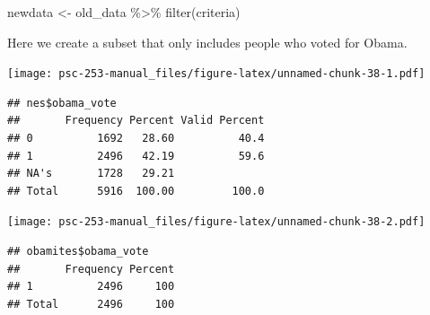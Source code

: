 \documentclass[
]{book}
\newenvironment{Shaded}{\begin{snugshade}}{\end{snugshade}}
\newcommand{\CommentTok}[1]{\textcolor[rgb]{0.56,0.35,0.01}{\textit{#1}}}
\newcommand{\DecValTok}[1]{\textcolor[rgb]{0.00,0.00,0.81}{#1}}
\newcommand{\FunctionTok}[1]{\textcolor[rgb]{0.00,0.00,0.00}{#1}}
\newcommand{\NormalTok}[1]{#1}
\newcommand{\OtherTok}[1]{\textcolor[rgb]{0.56,0.35,0.01}{#1}}
\newcommand{\SpecialCharTok}[1]{\textcolor[rgb]{0.00,0.00,0.00}{#1}}
\begin{document}
\begin{Shaded}
\begin{Highlighting}[]
\NormalTok{newdata }\OtherTok{\textless{}{-}}\NormalTok{ old\_data }\SpecialCharTok{\%\textgreater{}\%}
  \FunctionTok{filter}\NormalTok{(criteria)}
\end{Highlighting}
\end{Shaded}

Here we create a subset that only includes people who voted for Obama.

\begin{Shaded}
\end{Shaded}

\texttt{[image: psc-253-manual\_files/figure-latex/unnamed-chunk-38-1.pdf]}

\begin{verbatim}
## nes$obama_vote 
##       Frequency Percent Valid Percent
## 0          1692   28.60          40.4
## 1          2496   42.19          59.6
## NA's       1728   29.21              
## Total      5916  100.00         100.0
\end{verbatim}

\begin{Shaded}
\end{Shaded}

\texttt{[image: psc-253-manual\_files/figure-latex/unnamed-chunk-38-2.pdf]}

\begin{verbatim}
## obamites$obama_vote 
##       Frequency Percent
## 1          2496     100
## Total      2496     100
\end{verbatim}
\end{document}
